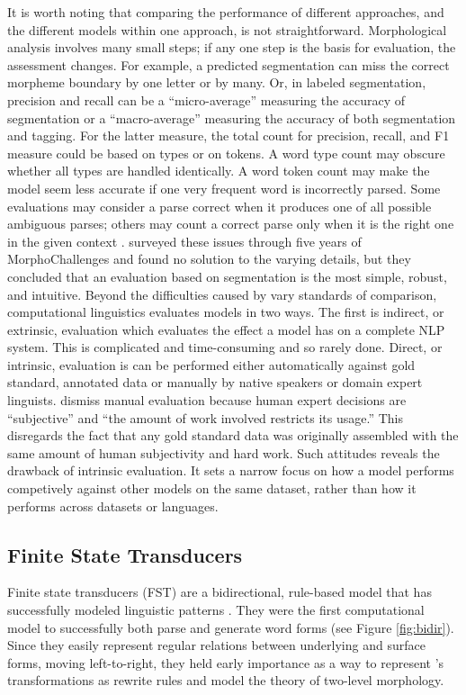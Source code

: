 \documentclass[12pt]{article}
\begin{document}
It is worth noting that comparing the performance of different approaches, and the different models within one approach, is not straightforward. Morphological analysis involves many small steps; if any one step is the basis for evaluation, the assessment changes. For example, a predicted segmentation can miss the correct morpheme boundary by one letter or by many. Or, in labeled segmentation, precision and recall can be a ``micro-average'' measuring the accuracy of segmentation or a ``macro-average'' measuring the accuracy of both segmentation and tagging. For the latter measure, the total count for precision, recall, and F1 measure could be based on types or on tokens. A word type count may obscure whether all types are handled identically. A word token count may make the model seem less accurate if one very frequent word is incorrectly parsed. Some evaluations may consider a parse correct when it produces one of all possible ambiguous parses; others may count a correct parse only when it is the right one in the given context \cite{ruokolainen_supervised_2013}.  surveyed these issues through five years of MorphoChallenges and found no solution to the varying details, but they concluded that an evaluation based on segmentation is the most simple, robust, and intuitive. Beyond the difficulties caused by vary standards of comparison, computational linguistics evaluates models in two ways. The first is indirect, or extrinsic, evaluation which evaluates the effect a model has on a complete NLP system. This is complicated and time-consuming and so rarely done. Direct, or intrinsic, evaluation is can be performed either automatically against gold standard, annotated data or manually by native speakers or domain expert linguists.  dismiss manual evaluation because human expert decisions are ``subjective'' and ``the amount of work involved restricts its usage.'' This disregards the fact that any gold standard data was originally assembled with the same amount of human subjectivity and hard work. Such attitudes reveals the drawback of intrinsic evaluation. It sets a narrow focus on how a model performs competively against other models on the same dataset, rather than how it performs across datasets or languages. 

\subsection{Finite State Transducers}

Finite state transducers (FST) are a bidirectional, rule-based model that has successfully modeled linguistic patterns \cite{koskenniemi_two-level_1983,beesley_finite-state_2003,hulden_finite-state_2009}. They were the first computational model to successfully both parse and generate word forms \cite{goodman_generation_2013} (see Figure \ref{fig:bidir}). Since they easily represent regular relations between underlying and surface forms, moving left-to-right, they held early importance as a way to represent 's transformations as rewrite rules \cite{karttunen_2005} and model the theory of two-level morphology.
\bigskip
\end{document}
